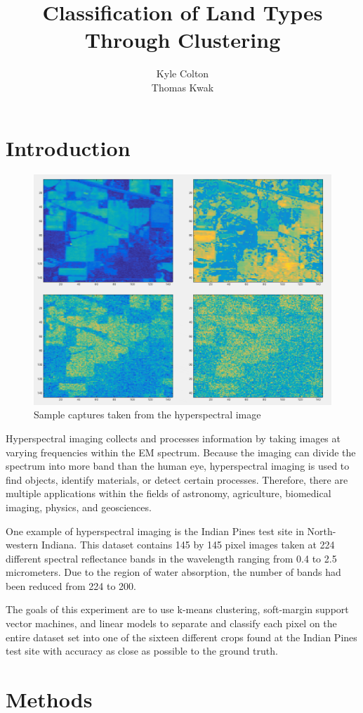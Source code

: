 \documentclass[10pt,letterpaper]{article}
\author{Kyle Colton \\ Thomas Kwak}
\title{Classification of Land Types Through Clustering}
\begin{document}
\maketitle

\section{Introduction}
\begin{figure}
\begin{center}
\includegraphics[width=.28\textwidth]{hyperSample.png}
\end{center}
\caption{Sample captures taken from the hyperspectral image}
\end{figure}
Hyperspectral imaging collects and processes information by taking images at varying frequencies within the EM spectrum. Because the imaging can divide the spectrum into more band than the human eye, hyperspectral imaging is used to find objects, identify materials, or detect certain processes. Therefore, there are multiple applications within the fields of astronomy, agriculture, biomedical imaging, physics, and geosciences.

One example of hyperspectral imaging is the Indian Pines test site in North-western Indiana. This dataset contains 145 by 145 pixel images taken at 224 different spectral reflectance bands in the wavelength ranging from 0.4 to 2.5 micrometers. Due to the region of water absorption, the number of bands had been reduced from 224 to 200.

The goals of this experiment are to use k-means clustering, soft-margin support vector machines, and linear models to separate and classify each pixel on the entire dataset set into one of the sixteen different crops found at the Indian Pines test site with accuracy as close as possible to the ground truth.
\section{Methods}
\end{document}
